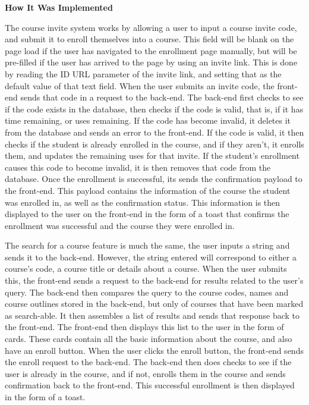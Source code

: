 \textbf{How It Was Implemented}

The course invite system works by allowing a user to input a course invite code, and submit it to enroll themselves into a course. This field will be blank on the page load if the user has navigated to the enrollment page manually, but will be pre-filled if the user has arrived to the page by using an invite link. This is done by reading the ID URL parameter of the invite link, and setting that as the default value of that text field. When the user submits an invite code, the front-end sends that code in a request to the back-end. The back-end first checks to see if the code exists in the database, then checks if the code is valid, that is, if it has time remaining, or uses remaining. If the code has become invalid, it deletes it from the database and sends an error to the front-end. If the code is valid, it then checks if the student is already enrolled in the course, and if they aren't, it enrolls them, and updates the remaining uses for that invite. If the student's enrollment causes this code to become invalid, it is then removes that code from the database. Once the enrollment is successful, its sends the confirmation payload to the front-end. This payload contains the information of the course the student was enrolled in, as well as the confirmation status. This information is then displayed to the user on the front-end in the form of a toast that confirms the enrollment was successful and the course they were enrolled in.

The search for a course feature is much the same, the user inputs a string and sends it to the back-end. However, the string entered will correspond to either a course's code, a course title or details about a course. When the user submits this, the front-end sends a request to the back-end for results related to the user's query. The back-end then compares the query to the course codes, names and course outlines stored in the back-end, but only of courses that have been marked as search-able. It then assembles a list of results and sends that response back to the front-end. The front-end then displays this list to the user in the form of cards. These cards contain all the basic information about the course, and also have an enroll button. When the user clicks the enroll button, the front-end sends the enroll request to the back-end. The back-end then does checks to see if the user is already in the course, and if not, enrolls them in the course and sends confirmation back to the front-end. This successful enrollment is then displayed in the form of a toast.

